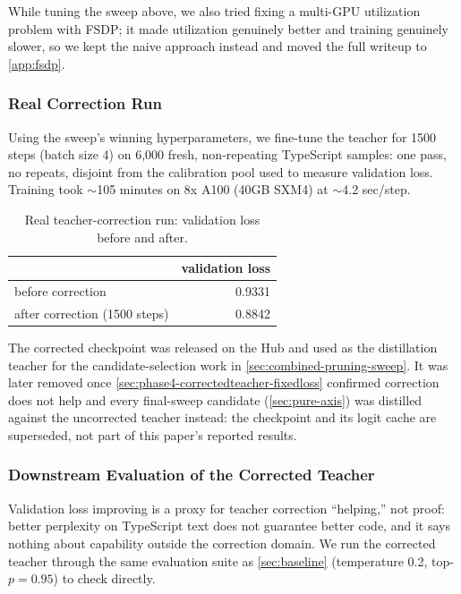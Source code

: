 \documentclass{article}
\theoremstyle{plain}
\theoremstyle{definition}
\theoremstyle{remark}
\begin{document}
While tuning the sweep above, we also tried fixing a multi-GPU
utilization problem with FSDP; it made utilization genuinely better and
training genuinely slower, so we kept the naive approach instead and
moved the full writeup to \cref{app:fsdp}.

\subsubsection{Real Correction Run}

Using the sweep's winning hyperparameters, we fine-tune the teacher for
1500 steps (batch size 4) on 6{,}000 fresh, non-repeating TypeScript
samples: one pass, no repeats, disjoint from the calibration pool used
to measure validation loss. Training took $\sim$105 minutes on 8x A100
(40GB SXM4) at $\sim$4.2 sec/step.

\begin{table}[t]
\centering
\begin{tabular}{lr}
\toprule
& validation loss \\
\midrule
before correction & 0.9331 \\
after correction (1500 steps) & 0.8842 \\
\bottomrule
\end{tabular}
\caption{Real teacher-correction run: validation loss before and after.}
\label{table:teacher-correction-real}
\end{table}

The corrected checkpoint was released on the Hub and used as the
distillation teacher for the candidate-selection work in
\cref{sec:combined-pruning-sweep}. It was later removed once
\cref{sec:phase4-correctedteacher-fixedloss} confirmed correction does
not help and every final-sweep candidate (\cref{sec:pure-axis}) was
distilled against the uncorrected teacher instead: the checkpoint and
its logit cache are superseded, not part of this paper's reported
results.

\subsubsection{Downstream Evaluation of the Corrected Teacher}
\label{sec:teacher-correction-eval}

Validation loss improving is a proxy for teacher correction ``helping,''
not proof: better perplexity on TypeScript text does not guarantee
better code, and it says nothing about capability outside the correction
domain. We run the corrected teacher through the same evaluation suite
as \cref{sec:baseline} (temperature 0.2, top-$p{=}0.95$) to check
directly.
\end{document}
